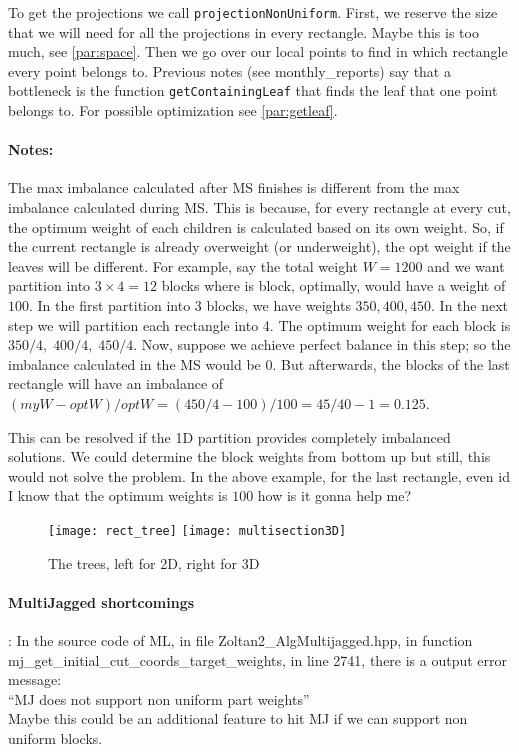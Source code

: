\documentclass[a4paper,10pt]{article}
\newcommand{\quot}[1]{``#1''}
\begin{document}
To get the projections we call \texttt{projectionNonUniform}. First, we reserve the size that we 
will need for all the projections in every rectangle. Maybe this is too much, see \cref{par:space}.
Then we go over our local points to find in which rectangle every point belongs to. 
Previous notes (see monthly\_reports) say that a bottleneck is the function \texttt{getContainingLeaf}
that finds the leaf that one point belongs to. For possible optimization see \cref{par:getleaf}.

\paragraph*{Notes:} The max imbalance calculated after MS finishes is different from the max 
imbalance calculated during MS. This is because, for every rectangle at every cut, the optimum
weight of each children is calculated based on its own weight. So, if the current rectangle
is already overweight (or underweight), the opt weight if the leaves will be different.
For example, say the total weight $W=1200$ and we want partition into $3\times 4=12$ blocks where is 
block, optimally, would have a weight of $100$. In the first partition into 3 blocks, we have
weights $350, 400, 450$. In the next step we will partition each rectangle into 4. The optimum weight 
for each block is $350/4,\;400/4,\;450/4$. Now, suppose we achieve perfect balance in this step; so
the imbalance calculated in the MS would be 0. But afterwards, the blocks of the last rectangle 
will have an imbalance of $(myW-optW)/optW = (450/4-100)/100= 45/40-1 = 0.125$.

This can be resolved if the 1D partition provides completely imbalanced solutions.
We could determine the block weights from bottom up but still, this would not solve the problem.
In the above example, for the last rectangle, even id I know that the optimum weights is $100$
how is it gonna help me?

\begin{figure}
\texttt{[image: rect\_tree]}
\hfill
\texttt{[image: multisection3D]}

\caption{The trees, left for 2D, right for 3D}
\end{figure}

\paragraph*{MultiJagged shortcomings}: In the source code of ML, in file Zoltan2\_AlgMultijagged.hpp,
in function mj\_get\_initial\_cut\_coords\_target\_weights, in line 2741, there is a output error
message: \\
\quot{MJ does not support non uniform part weights} \\
Maybe this could be an additional feature to hit MJ if we can support non uniform blocks.
\end{document}
